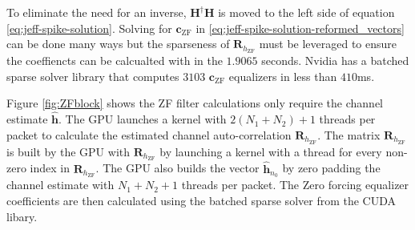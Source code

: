 To eliminate the need for an inverse, $\mathbf{H}^\dag\mathbf{H}$ is moved to the left side of equation \eqref{eq:jeff-spike-solution}. Solving for $\mathbf{c}_\text{ZF}$ in \eqref{eq:jeff-spike-solution-reformed_vectors} can be done many ways but the sparseness of $\mathbf{R}_{h_\text{ZF}}$ must be leveraged to ensure the coeffiencts can be calcualted with in the $1.9065$ seconds. 
Nvidia has a batched sparse solver library that computes $3103$ $\mathbf{c}_\text{ZF}$ equalizers in less than $410$ms.

Figure \ref{fig:ZFblock} shows the ZF filter calculations only require the channel estimate $\hat{\mathbf{h}}$.
The GPU launches a kernel with $2(N_1+N_2)+1$ threads per packet to calculate the estimated channel auto-correlation $\mathbf{R}_{h_\text{ZF}}$.
The matrix $\mathbf{R}_{h_\text{ZF}}$ is built by the GPU with $\mathbf{R}_{h_\text{ZF}}$ by launching a kernel with a thread for every non-zero index in $\mathbf{R}_{h_\text{ZF}}$.
The GPU also builds the vector $\hat{\mathbf{h}}_{n_0}$ by zero padding the channel estimate with $N_1+N_2+1$ threads per packet.
The Zero forcing equalizer coefficients are then calculated using the batched sparse solver from the CUDA libary.



\clearpage
